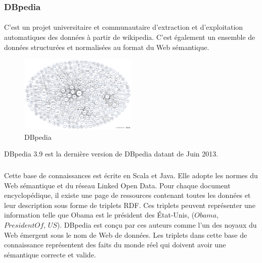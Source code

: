 \documentclass[12pt,a4]{report}
\begin{document}
\subsubsection{DBpedia}
\paragraph{}

C'est un projet universitaire et communautaire d’extraction et d’exploitation automatiques des données à partir de wikipedia. C’est également un ensemble de données structurées et normalisées au format du Web sémantique.
\begin{figure}
\vspace{-10pt}
\begin{center}
\includegraphics[width=0.50\textwidth]{dbpedia.png}
\end{center}
\vspace{-15pt}
\caption{DBpedia}
\vspace{-10pt}
\end{figure}
DBpedia 3.9 est la dernière version de DBpedia datant de Juin 2013.
\subparagraph{}
Cette base de connaissances est écrite en Scala et Java. Elle adopte les normes du Web sémantique et du réseau Linked Open Data. Pour chaque document encyclopédique, il existe une page de ressources contenant toutes les données et leur description sous forme de triplets RDF. Ces triplets peuvent représenter une information telle que Obama est le président des État-Unis, ($Obama$, $PresidentOf$, $US$).
DBpedia est conçu par ces auteurs comme l'un des noyaux du Web émergent sous le nom de Web de données. Les triplets dans cette base de connaissance représentent des faits du monde réel qui doivent avoir une sémantique correcte et valide.

\newpage
\end{document}
